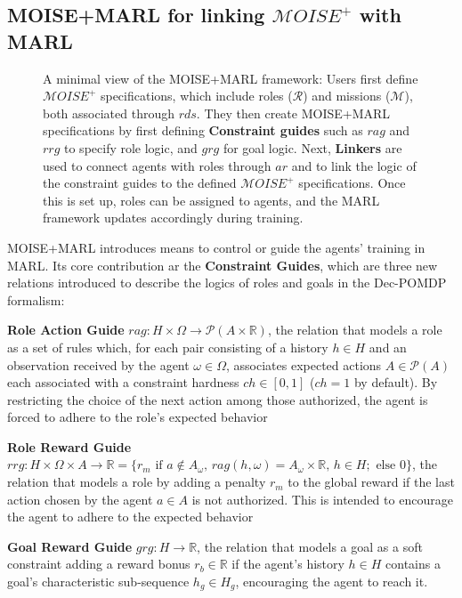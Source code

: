 \documentclass[pdflatex,sn-mathphys-num]{sn-jnl}%
\theoremstyle{thmstyleone}%
\theoremstyle{thmstyletwo}%
\theoremstyle{thmstylethree}%
\begin{document}
\subsection{MOISE+MARL for linking $\mathcal{M}OISE^+$ with MARL}

\begin{figure}[h!]
    \centering
    
    \caption{A minimal view of the MOISE+MARL framework:
        Users first define $\mathcal{M}OISE^+$ specifications, which include roles ($\mathcal{R}$) and missions ($\mathcal{M}$), both associated through $rds$. They then create MOISE+MARL specifications by first defining \textbf{Constraint guides} such as $rag$ and $rrg$ to specify role logic, and $grg$ for goal logic. 
        Next, \textbf{Linkers} are used to connect agents with roles through $ar$ and to link the logic of the constraint guides to the defined $\mathcal{M}OISE^+$ specifications. Once this is set up, roles can be assigned to agents, and the MARL framework updates accordingly during training.
    }
    \label{fig:mm_synthesis}
\end{figure}

\noindent MOISE+MARL introduces means to control or guide the agents' training in MARL. Its core contribution ar the \textbf{Constraint Guides}, which are three new relations introduced to describe the logics of roles and goals in the Dec-POMDP formalism:
%
\begin{enumerate*}[label={\roman*) },itemjoin={; \quad}]
    
    \item \textbf{Role Action Guide} \quad $rag: H \times \Omega \rightarrow \mathcal{P}(A \times \mathbb{R})$, the relation that models a role as a set of rules which, for each pair consisting of a history $h \in H$ and an observation received by the agent $\omega \in \Omega$, associates expected actions $A \in \mathcal{P}(A)$ each associated with a constraint hardness $ch \in [0,1]$ ($ch = 1$ by default). By restricting the choice of the next action among those authorized, the agent is forced to adhere to the role's expected behavior
    \item \textbf{Role Reward Guide} \quad $rrg: H \times \Omega \times A \to \mathbb{R} = \{r_m \text{ if } a \notin A_\omega \text{, } rag(h, \omega) \allowbreak = \allowbreak A_\omega \times \mathbb{R} \text{, } h \in H; \text{ else } 0\}$, the relation that models a role by adding a penalty $r_m$ to the global reward if the last action chosen by the agent $a \in A$ is not authorized. This is intended to encourage the agent to adhere to the expected behavior
    \item \textbf{Goal Reward Guide} \quad $grg: H \rightarrow \mathbb{R}$, the relation that models a goal as a soft constraint adding a reward bonus $r_b \in \mathbb{R}$ if the agent's history $h \in H$ contains a goal's characteristic sub-sequence $h_g \in H_g$, encouraging the agent to reach it.
\end{enumerate*}
\end{document}
